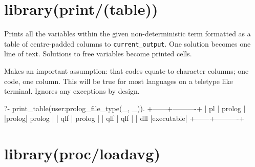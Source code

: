 \chapter{library(print/(table))}\label{sec:table}

\begin{description}
\nodescription
Prints all the variables within the given non-deterministic 
term formatted as a table of centre-padded columns to
\verb$current_output$. One  solution becomes one line of text.
Solutions to free variables become printed cells.

Makes an important assumption: that codes equate to character
columns; one code, one column. This will be true for most languages
on a teletype like terminal. Ignores any exceptions by design.

\begin{code}
?- print_table(user:prolog_file_type(_, _)).
+------+----------+
|  pl  |  prolog  |
|prolog|  prolog  |
| qlf  |  prolog  |
| qlf  |   qlf    |
| dll  |executable|
+------+----------+
\end{code}

\end{description}

\chapter{library(proc/loadavg)}\label{sec:loadavg}

